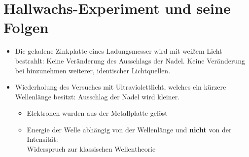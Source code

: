\section{Hallwachs-Experiment und seine Folgen}
\begin{itemize}
\item Die geladene Zinkplatte eines Ladungsmesser wird mit weißem Licht bestrahlt: Keine Veränderung des Ausschlags der Nadel. Keine Veränderung bei hinzunehmen weiterer, identischer Lichtquellen.
\item Wiederholung des Versuches mit Ultraviolettlicht, welches ein kürzere Wellenlänge besitzt: Ausschlag der Nadel wird kleiner.
\begin{itemize}
	\item Elektronen wurden aus der Metallplatte gelöst
	\item Energie der Welle abhängig von der Wellenlänge und \textbf{nicht} von der Intensität:\\ Widerspruch zur klassischen Wellentheorie
\end{itemize}
\end{itemize}

